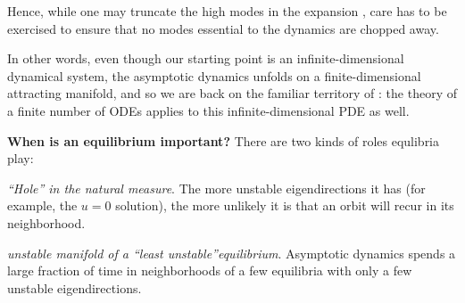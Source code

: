 Hence, while one may truncate the high modes in the expansion
, care has to be exercised to ensure that no modes
essential to the dynamics are chopped away. 

In other words, even though our starting point
is an infinite-dimensional dynamical system, the asymptotic dynamics
unfolds on a finite-dimensional attracting manifold, and so we are back on
the familiar territory of :
the theory of a finite number of ODEs applies to this
infinite-dimensional PDE as well.

    {\bf When is an equilibrium important?} There are two kinds of roles
equlibria play:

{\em ``Hole'' in the natural measure}.
The more unstable eigendirections it has (for example, the
$u=0$ solution), the more unlikely it is  that
an orbit will recur in its neighborhood.

{\em unstable manifold of a ``least unstable''equilibrium}.
 Asymptotic dynamics
spends  a large fraction of time in
neighborhoods of a few  equilibria with
only a few unstable eigendirections.


